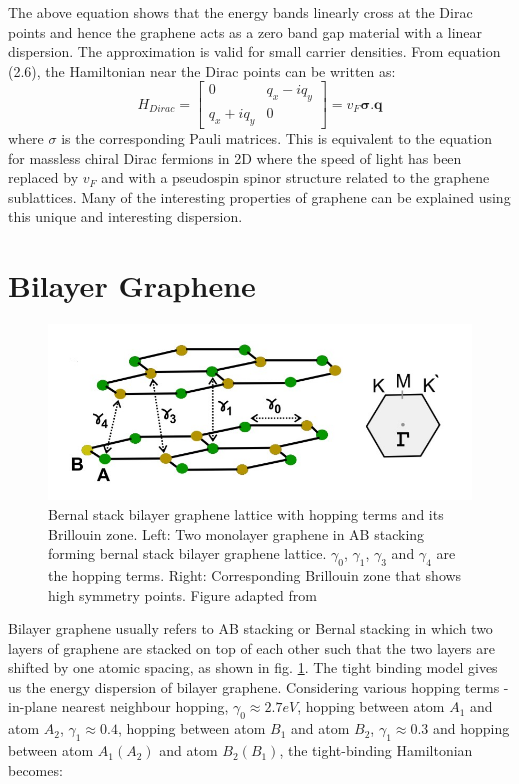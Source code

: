 The above equation shows that the energy bands linearly cross at the Dirac points and hence the graphene acts as a zero band gap material with a linear dispersion. The approximation is valid for small carrier densities. From equation (2.6), the Hamiltonian near the Dirac points can be written as:
\begin{equation}
    H_{Dirac} =\begin{bmatrix}
0 & q_x-i q_y \\
q_x+i q_y & 0 
\end{bmatrix} = v_F\mathbf{\sigma}.\mathbf{q}
\end{equation}
where $\sigma$ is the corresponding Pauli matrices. This is equivalent to the equation for massless chiral Dirac fermions in 2D where the speed of light has been replaced by $v_F$ and with a pseudospin spinor structure related to the graphene sublattices. Many of the interesting properties of graphene can be explained using this unique and interesting dispersion.

\section{Bilayer Graphene}
  \begin{figure}[H]
         \centering
         \includegraphics[width=\textwidth]{figures/bilayer_lattice.jpg}
         \caption{Bernal stack bilayer graphene lattice with hopping terms and its Brillouin zone. Left: Two monolayer graphene in AB stacking forming bernal stack bilayer graphene lattice. $\gamma_0$, $\gamma_1$, $\gamma_3$ and $\gamma_4$ are the hopping terms. Right: Corresponding Brillouin zone that shows high symmetry points. Figure adapted from \cite{Geim}}
         \label{fig:bilayer_lattice}
 \end{figure}
Bilayer graphene usually refers to AB stacking or Bernal stacking in which two layers of graphene are stacked on top of each other such that the two layers are shifted by one atomic spacing, as shown in fig. \ref{fig:bilayer_lattice}. The tight binding model gives us the energy dispersion of bilayer graphene. Considering various hopping terms - in-plane nearest neighbour hopping, $\gamma_0\approx2.7 eV$, hopping between atom $A_1$ and atom  $A_2$, $\gamma_1\approx0.4$, hopping between atom $B_1$ and atom $B_2$, $\gamma_1\approx0.3$ and hopping between atom $A_1(A_2)$ and atom $B_2(B_1)$, the tight-binding Hamiltonian becomes:


